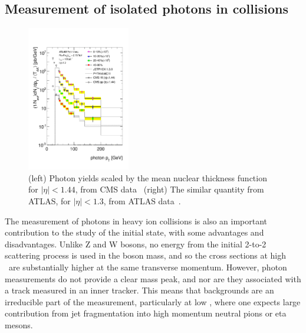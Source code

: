 \subsection{Measurement of isolated photons in \PbPb collisions}

\begin{figure}[!htb]
\begin{center}
\includegraphics[width=0.40\textwidth]{electroweak_figs/ph_fig_11.pdf}
\caption[]{(left) Photon yields scaled by the mean nuclear thickness function for $|\eta|<1.44$, from CMS data~\cite{Chatrchyan:2012vq} (right) The similar quantity from ATLAS, for $|\eta|<1.3$, from ATLAS data~\cite{ATLAS:2012zla}.}
\label{fig:pas:photon}
\end{center}
\end{figure}

The measurement of photons in heavy ion collisions is also an important contribution to the
study of the \PbPb initial state, with some advantages and disadvantages.  Unlike Z and W bosons,
no energy from the initial 2-to-2 scattering process is used in the boson mass,
and so the cross sections at high \pT\ are substantially higher at the same transverse momentum.
However, photon measurements do not provide a clear mass peak, and nor are they associated with
a track measured in an inner tracker.  This means that backgrounds are an irreducible part of
the measurement, particularly at low \pT, where one expects large contribution from jet fragmentation
into high momentum neutral pions or eta mesons.

